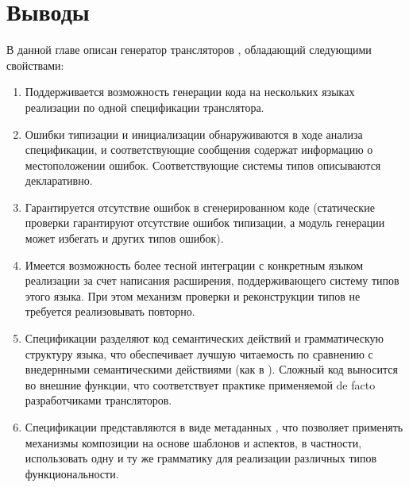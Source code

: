 \chapter{Выводы}

В данной главе описан генератор трансляторов \ATF{}, обладающий следующими свойствами:
\begin{enumerate}
\item Поддерживается возможность генерации кода на нескольких языках реализации по одной спецификации транслятора. 
\item Ошибки типизации и инициализации обнаруживаются в ходе анализа спецификации, и соответствующие сообщения содержат информацию о местоположении ошибок. Соответствующие системы типов описываются декларативно.
\item Гарантируется отсутствие ошибок в сгенерированном коде (статические проверки гарантируют отсутствие ошибок типизации, а модуль генерации может избегать и других типов ошибок). 
\item Имеется возможность более тесной интеграции с конкретным языком реализации за счет написания расширения, поддерживающего систему типов этого языка. При этом механизм проверки и реконструкции типов не требуется реализовывать повторно.
\item Спецификации разделяют код семантических действий и грамматическую структуру языка, что обеспечивает лучшую читаемость по сравнению с внедернными семантическими действиями (как в ). Сложный код выносится во внешние функции, что соответствует практике применяемой de facto разработчиками трансляторов.
\item Спецификации представляются в виде метаданных \GRM{}, что позволяет применять механизмы композиции на основе шаблонов и аспектов, в частности, использовать одну и ту же грамматику для реализации различных типов функциональности.
\end{enumerate}
